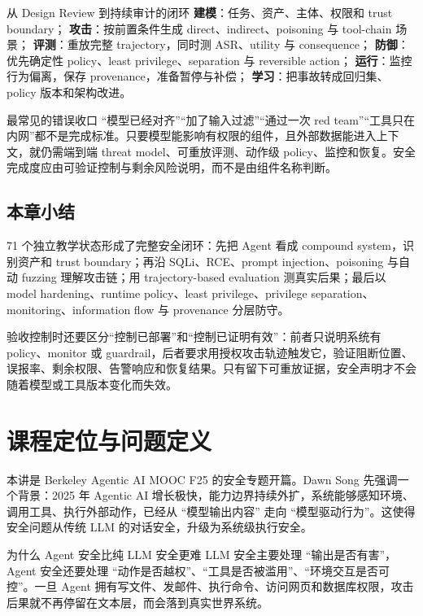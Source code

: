 \documentclass[a4paper]{article}
\begin{document}
\begin{importantbox}{从 Design Review 到持续审计的闭环}
\textbf{建模}：任务、资产、主体、权限和 trust boundary；
\textbf{攻击}：按前置条件生成 direct、indirect、poisoning 与 tool-chain 场景；
\textbf{评测}：重放完整 trajectory，同时测 ASR、utility 与 consequence；
\textbf{防御}：优先确定性 policy、least privilege、separation 与 reversible action；
\textbf{运行}：监控行为偏离，保存 provenance，准备暂停与补偿；
\textbf{学习}：把事故转成回归集、policy 版本和架构改进。
\end{importantbox}

\begin{warningbox}{最常见的错误收口}
“模型已经对齐”“加了输入过滤”“通过一次 red team”“工具只在内网”都不是完成标准。只要模型能影响有权限的组件，且外部数据能进入上下文，就仍需端到端 threat model、可重放评测、动作级 policy、监控和恢复。安全完成度应由可验证控制与剩余风险说明，而不是由组件名称判断。
\end{warningbox}

\subsection{本章小结}
71 个独立教学状态形成了完整安全闭环：先把 Agent 看成 compound system，识别资产和 trust boundary；再沿 SQLi、RCE、prompt injection、poisoning 与自动 fuzzing 理解攻击链；用 trajectory-based evaluation 测真实后果；最后以 model hardening、runtime policy、least privilege、privilege separation、monitoring、information flow 与 provenance 分层防守。

验收控制时还要区分“控制已部署”和“控制已证明有效”：前者只说明系统有 policy、monitor 或 guardrail，后者要求用授权攻击轨迹触发它，验证阻断位置、误报率、剩余权限、告警响应和恢复结果。只有留下可重放证据，安全声明才不会随着模型或工具版本变化而失效。

\section{课程定位与问题定义}

本讲是 Berkeley Agentic AI MOOC F25 的安全专题开篇。Dawn Song 先强调一个背景：2025 年 Agentic AI 增长极快，能力边界持续外扩，系统能够感知环境、调用工具、执行外部动作，已经从 ``模型输出内容'' 走向 ``模型驱动行为''。这使得安全问题从传统 LLM 的对话安全，升级为系统级执行安全。

\begin{importantbox}{为什么 Agent 安全比纯 LLM 安全更难}
LLM 安全主要处理 ``输出是否有害''，Agent 安全还要处理 ``动作是否越权''、``工具是否被滥用''、``环境交互是否可控''。一旦 Agent 拥有写文件、发邮件、执行命令、访问网页和数据库权限，攻击后果就不再停留在文本层，而会落到真实世界系统。
\end{importantbox}
\end{document}
